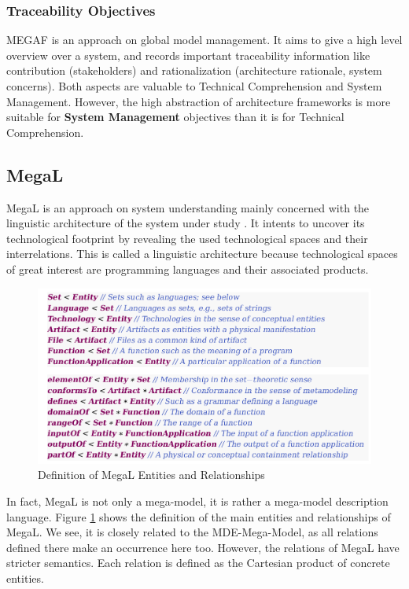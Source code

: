 \documentclass[runningheads,a4paper]{llncs}
\begin{document}
\subsubsection{Traceability Objectives}
MEGAF is an approach on global model management.
It aims to give a high level overview over a system, and records important traceability information like contribution (stakeholders) and rationalization (architecture rationale, system concerns).
Both aspects are valuable to Technical Comprehension and System Management.
However, the high abstraction of architecture frameworks is more suitable for \textbf{System Management} objectives than it is for Technical Comprehension.


\subsection{MegaL}
MegaL is an approach on system understanding mainly concerned with the linguistic architecture of the system under study \cite{MEGAL1}\cite{MEGAL2}. 
It intents to uncover its technological footprint by revealing the used technological spaces and their interrelations. 
This is called a linguistic architecture because technological spaces of great interest are programming languages and their associated products.

\begin{figure}
\centering
\includegraphics[width=\textwidth]{megal-definition.png}
\caption{Definition of MegaL Entities and Relationships \cite{MEGAL2}}
\label{fig:MegaL-Definition}
\end{figure}

In fact, MegaL is not only a mega-model, it is rather a mega-model description language. 
Figure \ref{fig:MegaL-Definition} shows the definition of the main entities and relationships of MegaL.
We see, it is closely related to the MDE-Mega-Model, as all relations defined there make an occurrence here too.
However, the relations of MegaL have stricter semantics.
Each relation is defined as the Cartesian product of concrete entities.
\end{document}

